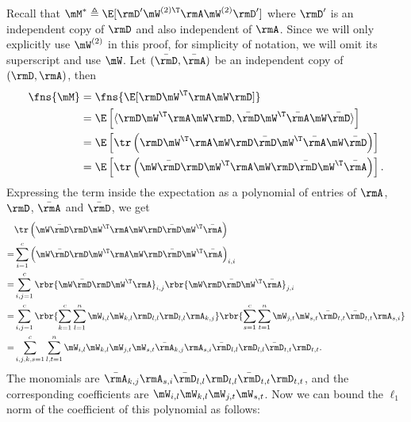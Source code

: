 \begin{proofof}{}
\begin{proofof}{}
Recall that $\mM^*\triangleq\E[\rmD'\mW^{(2)\T}\rmA\mW^{(2)}\rmD']$ where $\rmD'$ is an independent copy of $\rmD$ and also independent of $\rmA$.
Since we will only explicitly use $\mW^{(2)}$ in this proof, for simplicity of notation, we will omit its superscript and use $\mW$.
Let $(\bar{\rmD},\bar{\rmA})$ be an independent copy of $(\rmD,\rmA)$, then
\begin{equation}
\begin{split}
    \fns{\mM} &=\fns{\E[\rmD\mW^\T\rmA\mW\rmD]}\\
    &=\E\left[\langle \rmD\mW^\T\rmA\mW\rmD,\bar{\rmD}\mW^\T\bar{\rmA}\mW\bar{\rmD}\rangle\right]\\
    &=\E\left[\tr\left(\rmD\mW^\T\rmA\mW\rmD\bar{\rmD}\mW^\T\bar{\rmA}\mW\bar{\rmD}\right)\right]\\
    &=\E\left[\tr\left(\mW\bar{\rmD}\rmD\mW^\T\rmA\mW\rmD\bar{\rmD}\mW^\T\bar{\rmA}\right)\right].
\end{split}
\end{equation}
Expressing the term inside the expectation as a polynomial of entries of $\rmA$, $\rmD$, $\bar{\rmA}$ and $\bar{\rmD}$, we get
\begin{equation}
\label{eqn:proof-Mfnorm-polyexpression}
\begin{split}
     &\tr\left(\mW\bar{\rmD}\rmD\mW^\T\rmA\mW\rmD\bar{\rmD}\mW^\T\bar{\rmA}\right) \\
    =&\sum_{i=1}^c\left(\mW\bar{\rmD}\rmD\mW^\T\rmA\mW\rmD\bar{\rmD}\mW^\T\bar{\rmA}\right)_{i,i}\\
    =&\sum_{i,j=1}^c\rbr{\mW\bar{\rmD}\rmD\mW^\T\rmA}_{i,j}\rbr{\mW\rmD\bar{\rmD}\mW^\T\bar{\rmA}}_{j,i}\\
    =&\sum_{i,j=1}^c\rbr{\sum_{k=1}^c\sum_{l=1}^n\mW_{i,l}\mW_{k,l}\rmD_{l,l}\rmD_{l,l}\rmA_{k,j}}\rbr{\sum_{s=1}^c\sum_{t=1}^n\mW_{j,t}\mW_{s,t}\bar{\rmD}_{t,t}\bar{\rmD}_{t,t}\rmA_{s,i}}\\
    =&\sum_{i,j,k,s=1}^c\sum_{l,t=1}^n \mW_{i,l}\mW_{k,l}\mW_{j,t}\mW_{s,t}\bar{\rmA}_{k,j}\rmA_{s,i}\bar{\rmD}_{l,l}\rmD_{l,l}\bar{\rmD}_{t,t}\rmD_{t,t}.
\end{split}
\end{equation}
The monomials are $\bar{\rmA}_{k,j}\rmA_{s,i}\bar{\rmD}_{l,l}\rmD_{l,l}\bar{\rmD}_{t,t}\rmD_{t,t}$, and the corresponding coefficients are $\mW_{i,l}\mW_{k,l}\mW_{j,t}\mW_{s,t}$.
Now we can bound the $\ell_1$ norm of the coefficient of this polynomial as follows:


\end{proofof}
\end{proofof}
